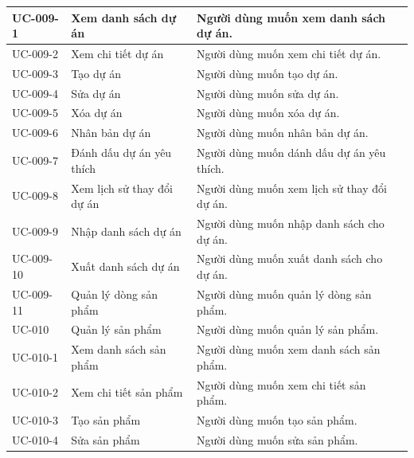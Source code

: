 \documentclass[12pt,a4paper]{article}
\begin{document}
\begin{center}
\begin{longtable}{|p{2.5cm}|p{4.5cm}|p{7.5cm}|c|}
            UC-009-1
            & Xem danh sách dự án
            & Người dùng muốn xem danh sách dự án.
            \\ \hline
            UC-009-2
            & Xem chi tiết dự án
            & Người dùng muốn xem chi tiết dự án.
            \\ \hline
            UC-009-3
            & Tạo dự án
            & Người dùng muốn tạo dự án.
            \\ \hline
            UC-009-4
            & Sửa dự án
            & Người dùng muốn sửa dự án.
            \\ \hline
            UC-009-5
            & Xóa dự án
            & Người dùng muốn xóa dự án.
            \\ \hline
            UC-009-6
            & Nhân bản dự án
            & Người dùng muốn nhân bản dự án.
            \\ \hline
            UC-009-7
            & Đánh dấu dự án yêu thích
            & Người dùng muốn dánh dấu dự án yêu thích.
            \\ \hline
            UC-009-8
            & Xem lịch sử thay đổi dự án
            & Người dùng muốn xem lịch sử thay đổi dự án.
            \\ \hline
            UC-009-9
            & Nhập danh sách dự án
            & Người dùng muốn nhập danh sách cho dự án.
            \\ \hline
            UC-009-10
            & Xuất danh sách dự án
            & Người dùng muốn xuất danh sách cho dự án.
            \\ \hline
            UC-009-11
            & Quản lý dòng sản phẩm
            & Người dùng muốn quản lý dòng sản phẩm.
            \\ \hline
            UC-010
            & Quản lý sản phẩm
            & Người dùng muốn quản lý sản phẩm.
            \\ \hline
            UC-010-1
            & Xem danh sách sản phẩm
            & Người dùng muốn xem danh sách sản phẩm.
            \\ \hline
            UC-010-2
            & Xem chi tiết sản phẩm
            & Người dùng muốn xem chi tiết sản phẩm.
            \\ \hline
            UC-010-3
            & Tạo sản phẩm
            & Người dùng muốn tạo sản phẩm.
            \\ \hline
            UC-010-4
            & Sửa sản phẩm
            & Người dùng muốn sửa sản phẩm.

\end{longtable}
\end{center}
\end{document}
